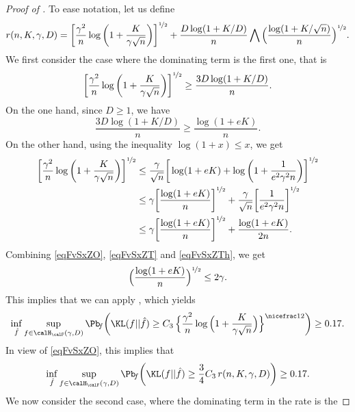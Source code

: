 \begin{proof}[Proof of ]
To ease notation, let us define
\begin{equation}
r(n,K,\gamma,D) = \bigg[\frac{\gamma^2}{n}
\log\bigg(1+\frac{K}{\gamma\sqrt{n}}\bigg)\bigg]^{\nicefrac12}
+ \frac{D\log(1+K/D)}{n}\bigwedge \Big(\frac{\log(1+K/\sqrt{n})}{n}\Big)^{\nicefrac12}.
\end{equation}
We first consider the case where the dominating term is the first one, that is 
\begin{equation}\label{eqFvSxZO}
\bigg[\frac{\gamma^2}{n} \log\bigg(1+\frac{K}{\gamma\sqrt{n}}\bigg)\bigg]^{\nicefrac12}
\ge \frac{ 3 D\log(1+K/D)}{n}.
\end{equation}
On the one hand, since $D\ge 1$, we have
\begin{equation}\label{eqFvSxZT}
\frac{ 3D\log(1+K/D)}{n}\ge \frac{ \log(1+eK)}{n}.
\end{equation}
On the other hand, using the inequality $\log(1+x)\le x$, we get
\begin{align}
\bigg[\frac{\gamma^2}{n} \log\bigg(1+\frac{K}{\gamma\sqrt{n}}\bigg)\bigg]^{\nicefrac12}
    &\le \frac{\gamma}{\sqrt{n}}\bigg[\log(1+eK)+\log\bigg(1+\frac{1}{e^2\gamma^2n}\bigg)\bigg]^{\nicefrac12}\\
    &\le \gamma\bigg[\frac{\log(1+eK)}{n}\bigg]^{\nicefrac12}+\frac{\gamma}{\sqrt{n}}\bigg[\frac{1}{e^2\gamma^2n}\bigg]^{\nicefrac12}\\
    &\le \gamma\bigg[\frac{\log(1+eK)}{n}\bigg]^{\nicefrac12}+\frac{\log (1+eK)}{2n}.\label{eqFvSxZTh}
\end{align}
Combining \eqref{eqFvSxZO}, \eqref{eqFvSxZT} and \eqref{eqFvSxZTh}, we get
\begin{equation}
\Big(\frac{\log(1+eK)}{n}\Big)^{\nicefrac12}\le 2\gamma.
\end{equation}
This implies that we can apply , which yields
\begin{equation}
\inf_{\hat f}\sup_{f \in \calH_\calF(\gamma,D)}\Pb\!_{f}\bigg(\KL(f||\hat f)\geq
C_3\,\Big\{{\frac{\gamma^2}n\log\Big(1+\frac{K}{\gamma\sqrt{n}}\Big)}\Big\}^{\nicefrac12}\bigg)\geq 0.17.
\end{equation}
In view of \eqref{eqFvSxZO}, this implies that
\begin{equation}\label{eqFvSxZFr}
\inf_{\hat f}\sup_{f \in \calH_\calF(\gamma,D)}\Pb\!_{f}\bigg(\KL(f||\hat f)\geq
\frac34C_3\,r(n,K,\gamma,D)\bigg)\geq 0.17.
\end{equation}
We now consider the second case, where the dominating term in the rate is the 

\end{proof}
